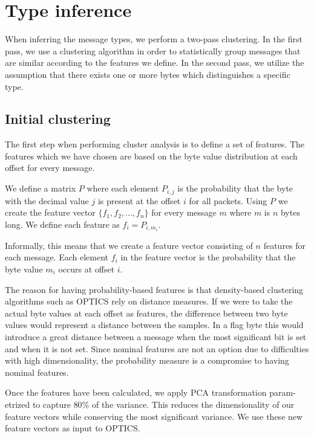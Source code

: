 \documentclass[a4paper]{report}
\begin{document}
\section{Type inference}
When inferring the message types, we perform a two-pass clustering. In the
first pass, we use a clustering algorithm in order to statistically group
messages that are similar according to the features we define. In the second
pass, we utilize the assumption that there exists one or more bytes which
distinguishes a specific type.

\subsection{Initial clustering}
\label{sec:init_clust}
The first step when performing cluster analysis is to define a set of features.
The features which we have chosen are based on the byte value distribution at
each offset for every message.

We define a matrix $P$ where each element $P_{i,j}$ is the probability that
the byte with the decimal value $j$ is present at the offset $i$ for all
packets. Using $P$ we create the feature vector $\{f_1, f_2, ..., f_n\}$ for
every message $m$ where $m$ is $n$ bytes long. We define each feature as
$f_i = P_{i, m_i}$.

Informally, this means that we create a feature vector consisting of $n$
features for each message. Each element $f_i$ in the feature vector is the
probability that the byte value $m_i$ occurs at offset $i$.

The reason for having probability-based features is that density-based
clustering algorithms such as OPTICS rely on distance measures. If we were to
take the actual byte values at each offset as features, the difference between
two byte values would represent a distance between the samples. In a flag byte
this would introduce a great distance between a message when the most
significant bit is set and when it is not set. Since nominal features are not
an option due to difficulties with high dimensionality, the probability
measure is a compromise to having nominal features.

Once the features have been calculated, we apply PCA transformation
param-etrized to capture $80\%$ of the variance. This reduces the
dimensionality of our feature vectors while conserving the most significant
variance. We use these new feature vectors as input to OPTICS.
\end{document}
